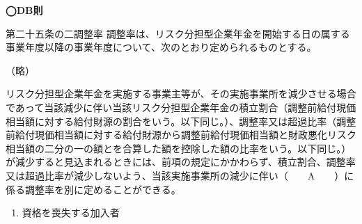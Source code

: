 \begin{fillblank}[年金1 2020 問題1(1)D]
  \noindent \textbf{◯DB則}
  \begin{lawstructure}
    \begin{lawarticle}{第二十五条の二}{調整率}
      調整率は、リスク分担型企業年金を開始する日の属する事業年度以降の事業年度について、次のとおり定められるものとする。

      （略）

      リスク分担型企業年金を実施する事業主等が、その実施事業所を減少させる場合であって当該減少に伴い当該リスク分担型企業年金の積立割合（調整前給付現価相当額に対する給付財源の割合をいう。以下同じ。）、調整率又は超過比率（調整前給付現価相当額に対する給付財源から調整前給付現価相当額と財政悪化リスク相当額の二分の一の額とを合算した額を控除した額の比率をいう。以下同じ。）が減少すると見込まれるときには、前項の規定にかかわらず、積立割合、調整率又は超過比率が減少しないよう、当該実施事業所の減少に伴い（　　A　　）に係る調整率を別に定めることができる。
    \end{lawarticle}
  \end{lawstructure}
\end{fillblank}

\begin{answerbox}
  \begin{enumerate}[A:]
    \item 資格を喪失する加入者
  \end{enumerate}
\end{answerbox}

